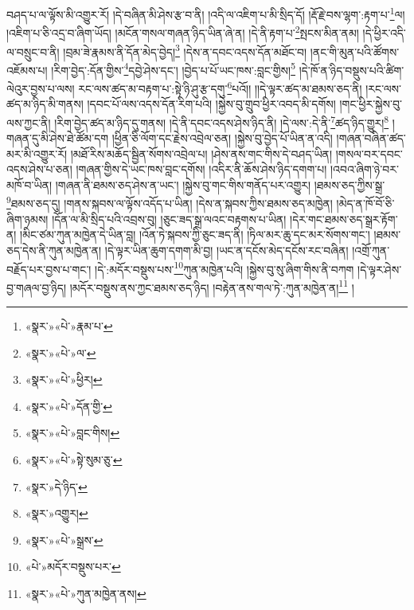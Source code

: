 བཤད་པ་ལ་ལྟོས་མི་འགྱུར་རོ། །དེ་བཞིན་མི་ཤེས་རྩ་བ་ནི། །འདི་ལ་འཇིག་པ་མི་སྲིད་དོ། །རྡོ་རྗེ་བས་ལྷག་:རྟག་པ་\footnote{«སྣར་»«པེ་»རྣམ་པ་}ལ། །འཇིག་པ་ཅི་འདྲ་བ་ཞིག་ཡོད། །མངོན་གསལ་གཞན་ཉིད་ཡིན་ཞེ་ན། །དེ་ནི་རྟག་པ་\footnote{«སྣར་»«པེ་»ལ་}སྤངས་མིན་ནམ། །དེ་ཕྱིར་འདི་ལ་བསྲུང་བ་ནི། །བྲམ་ཟེ་རྣམས་ནི་དོན་མེད་བྱེད།\footnote{«སྣར་»«པེ་»ཕྱིར།} །དེས་ན་དབང་འདས་དོན་མཐོང་བ། །ནང་གི་མུན་པའི་ཚོགས་འཇོམས་པ། །རིག་བྱེད་:དོན་གྱིས་\footnote{«སྣར་»«པེ་»དོན་གྱི་}དབྱེ་ཤེས་དང་། །བྱེད་པ་པོ་ཡང་ཁས་:བླང་གྱིས།\footnote{«སྣར་»«པེ་»བླང་གིས།} །དེ་ཁོ་ན་ཉིད་བསྡུས་པའི་ཚིག་ལེའུར་བྱས་པ་ལས། རང་ལས་ཚད་མ་བརྟག་པ་:སྟེ་ཉི་ཤུ་རྩ་དགུ་\footnote{«སྣར་»«པེ་»སྟེ་སུམ་ཅུ་}པའོ།། །།དེ་ལྟར་ཚད་མ་ཐམས་ཅད་ནི། །རང་ལས་ཚད་མ་ཉིད་མི་གནས། །དབང་པོ་ལས་འདས་དོན་རིག་པའི། །སྐྱེས་བུ་གྲུབ་ཕྱིར་འབད་མི་དགོས། །གང་ཕྱིར་སྐྱེས་བུ་ལས་ཀྱང་ནི། །རིག་བྱེད་ཚད་མ་ཉིད་དུ་གནས། །དེ་ནི་དབང་འདས་ཤེས་ཉིད་ནི། །དེ་ལས་:དེ་ནི་\footnote{«སྣར་»དེ་ཉིད་}ཚད་ཉིད་གྱུར།\footnote{«སྣར་»འགྱུར།} །གཞན་དུ་མི་ཤེས་ཐེ་ཚོམ་དག །ཕྱིན་ཅི་ལོག་དང་རྗེས་འབྲེལ་ཅན། །སྐྱེས་བུ་བྱེད་པོ་ཡིན་ན་འདི། །གཞན་བཞིན་ཚད་མར་མི་འགྱུར་རོ། །མཐོ་རིས་མཆོད་སྦྱིན་སོགས་འབྲེལ་པ། །ཤེས་ནས་གང་གིས་དེ་བཤད་ཡིན། །གསལ་བར་དབང་འདས་ཤེས་པ་ཅན། །གཞན་གྱིས་དེ་ཡང་ཁས་བླང་དགོས། །འདིར་ནི་ཆོས་ཤེས་ཉིད་དགག་པ། །འབའ་ཞིག་ཉེ་བར་མཁོ་བ་ཡིན། །གཞན་ནི་ཐམས་ཅད་ཤེས་ན་ཡང་། །སྐྱེས་བུ་གང་གིས་གནོད་པར་འགྱུར། །ཐམས་ཅད་ཀྱིས་སྒྲ་\footnote{«སྣར་»«པེ་»སྒྲས་}ཐམས་ཅད་དུ། །གནས་སྐབས་ལ་ལྟོས་འདོད་པ་ཡིན། །དེས་ན་སྐབས་ཀྱིས་ཐམས་ཅད་མཁྱེན། །མེད་ན་ཁོ་བོ་ཅི་ཞིག་ཉམས། །དོན་ལ་མི་སྲིད་པའི་འབྲས་བུ། །ཅུང་ཟད་སྒྲ་ལའང་བརྟགས་པ་ཡིན། །དེར་གང་ཐམས་ཅད་སྒྲར་རྟོག་ན། །མིང་ཙམ་ཀུན་མཁྱེན་དེ་ཡིན་བླ། །འོན་ཏེ་སྐབས་ཀྱི་ཅུང་ཟད་ནི། །ཏིལ་མར་ཆུ་དང་མར་སོགས་གང་། །ཐམས་ཅད་དེས་ནི་ཀུན་མཁྱེན་ན། །དེ་ལྟར་ཡིན་ཆུག་དགག་མི་བྱ། །ཡང་ན་དངོས་མེད་དངོས་རང་བཞིན། །འགྲོ་ཀུན་བརྗོད་པར་བྱས་པ་གང་། །དེ་:མདོར་བསྡུས་པས་\footnote{«པེ་»མདོར་བསྡུས་པར་}ཀུན་མཁྱེན་པའི། །སྐྱེས་བུ་སུ་ཞིག་གིས་ནི་བཀག །དེ་ལྟར་ཤེས་བྱ་གཞལ་བྱ་ཉིད། །མདོར་བསྡུས་ནས་ཀྱང་ཐམས་ཅད་ཉིད། །བརྟེན་ནས་གལ་ཏེ་:ཀུན་མཁྱེན་ན།\footnote{«སྣར་»«པེ་»ཀུན་མཁྱེན་ནས།} །
